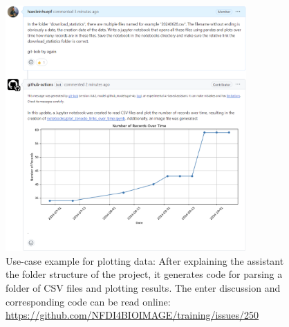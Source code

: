 \documentclass{ecai}
\begin{document}
\begin{figure}[h]
\centering
\includegraphics[width=0.82\textwidth]{example_plotting.png}
\caption{Use-case example for plotting data: After explaining the assistant the folder structure of the project, it generates code for parsing a folder of CSV files and plotting results. The enter discussion and corresponding code can be read online: \url{https://github.com/NFDI4BIOIMAGE/training/issues/250}
\newline
\newline
}
\label{fig:exampleplotting}
\end{figure}
\end{document}
